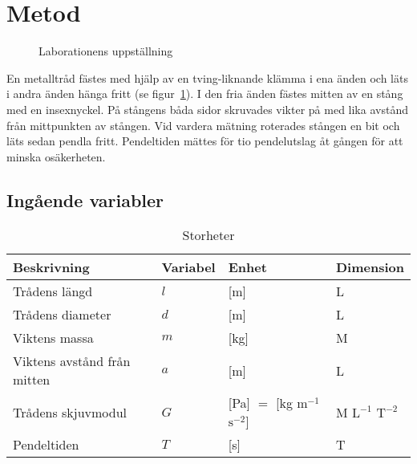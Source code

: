 \documentclass[a4paper,12pt]{article}
\begin{document}
\section{Metod}

\begin{figure}
\centering
{} 
\caption{Laborationens uppställning}
\label{fig:uppställning}
\end{figure}

En metalltråd fästes med hjälp av en tving-liknande klämma i ena änden och läts
i andra änden hänga fritt (se figur~\ref{fig:uppställning}). I den fria änden fästes
mitten av en stång med en insexnyckel. På stångens båda sidor skruvades vikter
på med lika avstånd från mittpunkten av stången. Vid vardera mätning roterades
stången en bit och läts sedan pendla fritt. Pendeltiden mättes för tio
pendelutslag åt gången för att minska osäkerheten.

\subsection{Ingående variabler}

\begin{table}[h!]
  \caption{Storheter}
  \label{tab:storheter}
  \begin{tabular} {| l | l | l | l |}
    \hline
    \textbf{Beskrivning} & \textbf{Variabel} & \textbf{Enhet} & \textbf{Dimension} \\\hline
    Trådens längd & $l$ & [m] & L \\\hline
    Trådens diameter & $d$ & [m] & L \\\hline
    Viktens massa & $m$ & [kg] & M \\\hline
    Viktens avstånd från mitten & $a$ & [m] & L \\\hline
    Trådens skjuvmodul & $G$ & [Pa] $=$ [kg $\mathrm{m}^{-1}$ $\mathrm{s}^{-2}$] & M $\mathrm{L}^{-1}$ $\mathrm{T}^{-2}$ \\\hline
    Pendeltiden & $T$ & [s] & T \\\hline
  \end{tabular}
\end{table}
\end{document}
